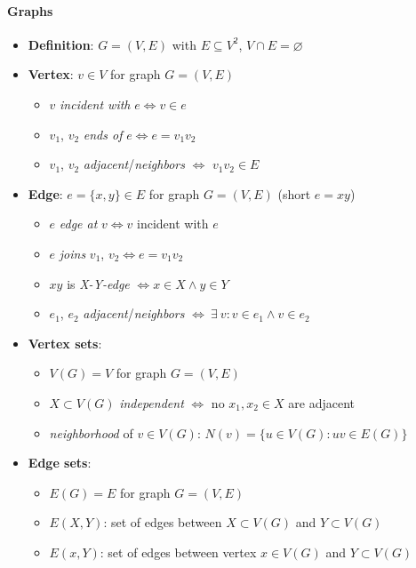 \paragraph{Graphs}
\begin{itemize}
  \item \textbf{Definition}: \( G = (V,E) \) with  $ E \subseteq V^2 $, $ V \cap E = \varnothing $
  \item \textbf{Vertex}: $ v \in V $ for graph $ G = (V,E) $
  \begin{itemize}
    \item $ v $ \emph{incident with} $ e \Leftrightarrow v \in e $  
    \item $ v_1 $, $ v_2 $ \emph{ends of} $ e \Leftrightarrow e = v_1v_2 $
    \item $ v_1 $, $ v_2 $ \emph{adjacent}/\emph{neighbors} $ \Leftrightarrow $ $ v_1v_2 \in E $
  \end{itemize}
  \item \textbf{Edge}: $ e = \{ x,y \} \in E $ for graph $ G = (V,E) $ (short $ e = xy $)
  \begin{itemize}
    \item $ e $ \emph{edge at} $ v \Leftrightarrow v $ incident with $ e $
    \item $ e $ \emph{joins} $ v_1 $, $ v_2 \Leftrightarrow e = v_1v_2 $
    \item $ xy $ is \emph{X-Y-edge} $ \Leftrightarrow x \in X \wedge y \in Y $
    \item $ e_1 $, $ e_2 $ \emph{adjacent}/\emph{neighbors} $ \Leftrightarrow \ \exists \ v: v \in e_1 \wedge v \in e_2 $
  \end{itemize}
  \item \textbf{Vertex sets}:
  \begin{itemize}
    \item $ V(G) = V $ for graph $ G = (V,E) $
    \item $ X \subset V(G) $ \emph{independent} $ \Leftrightarrow $ no $ x_1, x_2 \in X $ are adjacent
    \item \emph{neighborhood} of $ v \in V(G) $: $ N(v) = \{ u \in V(G) : uv \in E(G) \} $
  \end{itemize}
  \item \textbf{Edge sets}:
  \begin{itemize}
    \item $ E(G) = E $ for graph $ G = (V,E) $
    \item $ E(X,Y) $: set of edges between $ X \subset V(G) $ and $ Y \subset V(G) $
    \item $ E(x,Y) $: set of edges between vertex $ x \in V(G) $ and $ Y \subset V(G) $ 

\end{itemize}
\end{itemize}
